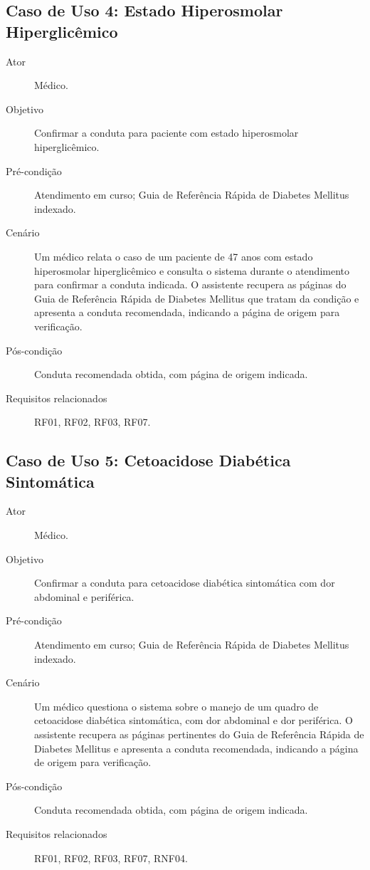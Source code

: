\documentclass[conference,a4paper]{IEEEtran}
\begin{document}
\subsection{Caso de Uso 4: Estado Hiperosmolar Hiperglicêmico}

\begin{description}
  \item[Ator] Médico.
  \item[Objetivo] Confirmar a conduta para paciente com estado hiperosmolar hiperglicêmico.
  \item[Pré-condição] Atendimento em curso; Guia de Referência Rápida de Diabetes Mellitus indexado.
  \item[Cenário] Um médico relata o caso de um paciente de 47 anos com estado hiperosmolar hiperglicêmico e consulta o sistema durante o atendimento para confirmar a conduta indicada. O assistente recupera as páginas do Guia de Referência Rápida de Diabetes Mellitus que tratam da condição e apresenta a conduta recomendada, indicando a página de origem para verificação.
  \item[Pós-condição] Conduta recomendada obtida, com página de origem indicada.
  \item[Requisitos relacionados] RF01, RF02, RF03, RF07.
\end{description}

\subsection{Caso de Uso 5: Cetoacidose Diabética Sintomática}

\begin{description}
  \item[Ator] Médico.
  \item[Objetivo] Confirmar a conduta para cetoacidose diabética sintomática com dor abdominal e periférica.
  \item[Pré-condição] Atendimento em curso; Guia de Referência Rápida de Diabetes Mellitus indexado.
  \item[Cenário] Um médico questiona o sistema sobre o manejo de um quadro de cetoacidose diabética sintomática, com dor abdominal e dor periférica. O assistente recupera as páginas pertinentes do Guia de Referência Rápida de Diabetes Mellitus e apresenta a conduta recomendada, indicando a página de origem para verificação.
  \item[Pós-condição] Conduta recomendada obtida, com página de origem indicada.
  \item[Requisitos relacionados] RF01, RF02, RF03, RF07, RNF04.
\end{description}
\end{document}
